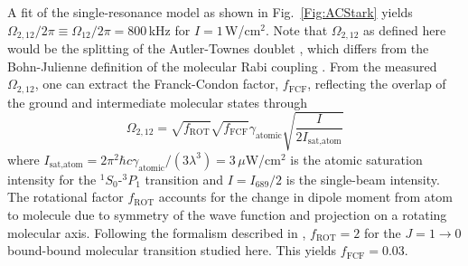 %





A fit of the single-resonance model as shown in Fig.\ \ref{Fig:ACStark} yields $\Omega_{2,12}/2\pi\equiv\Omega_{12}/2\pi=800$\,kHz for $I=1$\,W/cm$^2$.
Note that $\Omega_{2,12}$ as defined here would be the splitting of the Autler-Townes doublet \cite{pdt17}, which differs from the Bohn-Julienne definition of the molecular Rabi coupling \cite{bju96}. From the measured $\Omega_{2,12}$, one can extract the Franck-Condon factor, $f_{\text{FCF}}$, reflecting the overlap of the ground and intermediate molecular states through
\begin{equation}\label{Eq:FranckCondonRabiFrequency}
	\Omega_{2,12}=\sqrt{f_{\text{ROT}}}\sqrt{f_{\text{FCF}}}\gamma_{\text{atomic}}\sqrt{\frac{I}{2 I_{\text{sat,atom}}}}
\end{equation}
where $I_{\text{sat,atom}}=2\pi^2\hbar c \gamma_{\text{atomic}}/(3\lambda^3)=3$\,$\mu$W/cm$^2$ is the atomic saturation intensity for the $^1S_0$-$^3P_1$ transition and $I=I_{689}/2$ is the single-beam intensity. The rotational factor $f_{\text{ROT}}$ accounts for the change in dipole moment from atom to molecule due to symmetry of the wave function and projection on a rotating molecular axis. Following the formalism described in \cite{pdt17}, $f_{\text{ROT}}=2$ for the $J=1\rightarrow 0$ bound-bound molecular transition studied here. This yields $f_{\text{FCF}}=0.03$.

